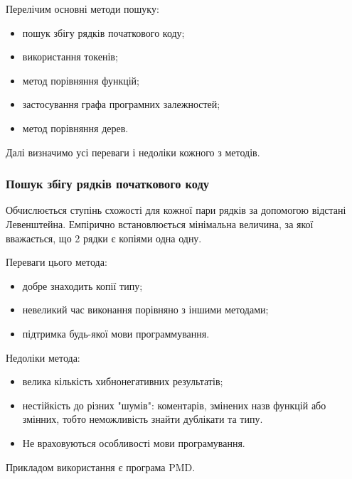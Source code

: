 \documentclass[a4paper, 14pt]{article}
\newcommand{\RNum}[1]{\uppercase\expandafter{\romannumeral #1\relax}}
\begin{document}
Перелічим основні методи пошуку:
\begin{itemize}
	\item пошук збігу рядків початкового коду; 
	\item використання токенів;
	\item метод порівняння функцій;
	\item застосування графа програмних залежностей;
	\item метод порівняння дерев.
\end{itemize}
Далі визначимо усі переваги і недоліки кожного з методів.

\subsubsection{Пошук збігу рядків початкового коду}
Обчислюється ступінь схожості для кожної пари рядків за допомогою відстані Левенштейна. Емпірично встановлюється мінімальна величина, за якої вважається, що 2 рядки є копіями одна одну. 

Переваги цього метода:  
\begin{itemize}
\item добре знаходить копії \RNum{1} типу;
\item невеликий час виконання порівняно з іншими методами;
\item підтримка будь-якої мови программування.
\end{itemize}

Недоліки метода:
\begin{itemize}
\item велика кількість хибнонегативних результатів;
\item нестійкість до різних "шумів": коментарів, змінених назв функцій або змінних, тобто неможливість знайти дублікати \RNum{2} та \RNum{3} типу. 
\item Не враховуються особливості мови програмування.
\end{itemize}
Прикладом використання є програма PMD.
\end{document}
